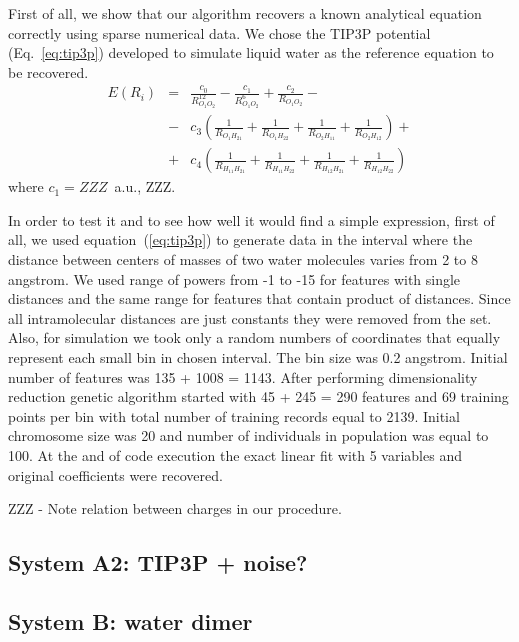\documentclass[aip,jcp,reprint,amsmath,amssymb,nature]{revtex4-1}
\begin{document}
First of all, we show that our algorithm recovers a known analytical equation correctly using sparse numerical data. We chose the  TIP3P potential (Eq.~\ref{eq:tip3p}) developed to simulate liquid water as the reference equation to be recovered. 
%
\begin{eqnarray} \label{eq:tip3p}
E(R_i) & = & \frac{c_0}{R_{O_1O_2}^{12}}-\frac{c_1}{R_{O_1O_2}^6} + \frac{c_2}{R_{O_1O_2}} - \nonumber \\
& - & c_3(\frac{1}{R_{O_1H_{21}}}+\frac{1}{R_{O_1H_{22}}}+\frac{1}{R_{O_2H_{11}}}+\frac{1}{R_{O_2H_{12}}}) + \nonumber\\
& + & c_4(\frac{1}{R_{H_{11}H_{21}}}+\frac{1}{R_{H_{11}H_{22}}}+\frac{1}{R_{H_{12}H_{21}}}+\frac{1}{R_{H_{12}H_{22}}})
\end{eqnarray}
%
where $c_1=ZZZ$~a.u., ZZZ.

In order to test it and to see how well it would find a simple expression, first of all, we used equation~(\ref{eq:tip3p}) to generate data in the interval where the distance between centers of masses of two water molecules varies from 2 to 8 angstrom. We used range of powers from -1 to -15 for features with single distances and the same range for features that contain product of distances. Since all intramolecular distances are just constants they were removed from the set. Also, for simulation we took only a random numbers of coordinates that equally represent each small bin in chosen interval. The bin size was 0.2 angstrom. Initial number of features was 135 + 1008 = 1143. After performing dimensionality reduction genetic algorithm started with 45 + 245 = 290 features and 69 training points per bin with total number of training records equal to  2139. Initial chromosome size was 20 and number of individuals in population was equal to 100. At the and of code execution the exact linear fit with 5 variables and original coefficients were recovered.

ZZZ - Note relation between charges in our procedure.

\subsection{System A2: TIP3P + noise?}

\subsection{System B: water dimer}

\end{document}

